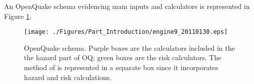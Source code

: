 An OpenQuake schema evidencing main inputs and calculators is represented in 
Figure \ref{fig:openquake_schema}.
\begin{landscape}
\begin{figure}
\texttt{[image: ./Figures/Part\_Introduction/engine9\_20110130.eps]}
\caption{OpenQuake schema. Purple boxes are the calculators included in the  
the hazard part of OQ; green boxes are the risk calculators. The method of 
\citet{wesson2009} is represented in a separate box since it incorporates 
hazard and risk calculations.}
\label{fig:openquake_schema}
\end{figure}
\end{landscape}
